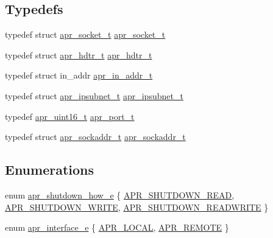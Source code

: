 \subsection*{Typedefs}
\begin{DoxyCompactItemize}
\item 
typedef struct \hyperlink{structapr__socket__t}{apr\+\_\+socket\+\_\+t} \hyperlink{group__apr__network__io_ga49262b223e7434746e1f1737659aa2c3}{apr\+\_\+socket\+\_\+t}
\item 
typedef struct \hyperlink{structapr__hdtr__t}{apr\+\_\+hdtr\+\_\+t} \hyperlink{group__apr__network__io_ga97887d5358a9c79c241ccafab61d8ff5}{apr\+\_\+hdtr\+\_\+t}
\item 
typedef struct in\+\_\+addr \hyperlink{group__apr__network__io_gad30d6c55a354a9a2e0a8747abb0c8176}{apr\+\_\+in\+\_\+addr\+\_\+t}
\item 
typedef struct \hyperlink{structapr__ipsubnet__t}{apr\+\_\+ipsubnet\+\_\+t} \hyperlink{group__apr__network__io_gac86ee04eb80f938902095d1d0a67c324}{apr\+\_\+ipsubnet\+\_\+t}
\item 
typedef \hyperlink{group__apr__platform_ga3fb87c977e28a526d872d1081411b129}{apr\+\_\+uint16\+\_\+t} \hyperlink{group__apr__network__io_gaa670a71960f6eb4fe0d0de2a1e7aba03}{apr\+\_\+port\+\_\+t}
\item 
typedef struct \hyperlink{structapr__sockaddr__t}{apr\+\_\+sockaddr\+\_\+t} \hyperlink{group__apr__network__io_ga373fb6f32d0875c5deb648b779c8a709}{apr\+\_\+sockaddr\+\_\+t}
\end{DoxyCompactItemize}
\subsection*{Enumerations}
\begin{DoxyCompactItemize}
\item 
enum \hyperlink{group__apr__network__io_gae2130f1fa2d0db58c5c3c9c73d9b4009}{apr\+\_\+shutdown\+\_\+how\+\_\+e} \{ \hyperlink{group__apr__network__io_ggae2130f1fa2d0db58c5c3c9c73d9b4009a88d0661d35eea5319715d6ca69265b01}{A\+P\+R\+\_\+\+S\+H\+U\+T\+D\+O\+W\+N\+\_\+\+R\+E\+AD}, 
\hyperlink{group__apr__network__io_ggae2130f1fa2d0db58c5c3c9c73d9b4009a5e335b392088e14df65d1bd5e0db7c46}{A\+P\+R\+\_\+\+S\+H\+U\+T\+D\+O\+W\+N\+\_\+\+W\+R\+I\+TE}, 
\hyperlink{group__apr__network__io_ggae2130f1fa2d0db58c5c3c9c73d9b4009add172f55ff5ee7b930683a3903c99768}{A\+P\+R\+\_\+\+S\+H\+U\+T\+D\+O\+W\+N\+\_\+\+R\+E\+A\+D\+W\+R\+I\+TE}
 \}
\item 
enum \hyperlink{group__apr__network__io_ga1982f44f48fdf00a8bd754bc7b773edc}{apr\+\_\+interface\+\_\+e} \{ \hyperlink{group__apr__network__io_gga1982f44f48fdf00a8bd754bc7b773edca6c23a4bf48b8f93dff08adf827382616}{A\+P\+R\+\_\+\+L\+O\+C\+AL}, 
\hyperlink{group__apr__network__io_gga1982f44f48fdf00a8bd754bc7b773edcaeb8be70b031f06a513ac0ebcaa5bac8a}{A\+P\+R\+\_\+\+R\+E\+M\+O\+TE}
 \}
\end{DoxyCompactItemize}
